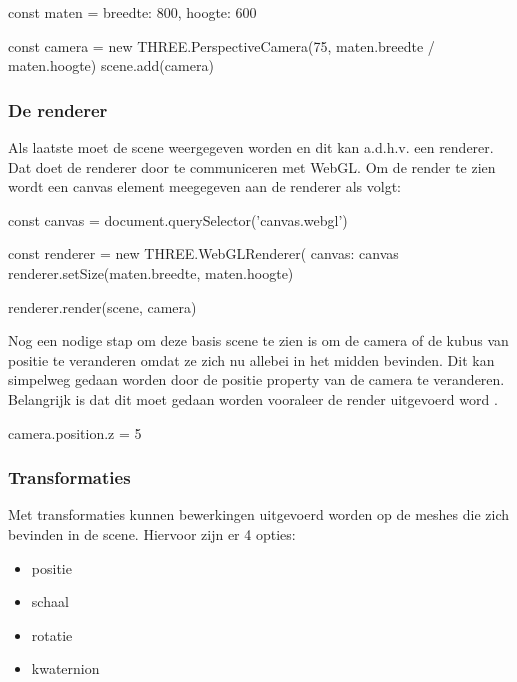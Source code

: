 \begin{LVerbatim}
const maten = {
	breedte: 800,
	hoogte: 600
}

const camera = new THREE.PerspectiveCamera(75, maten.breedte / maten.hoogte)
scene.add(camera)
\end{LVerbatim}

\subsubsection{De renderer}

Als laatste moet de scene weergegeven worden en dit kan a.d.h.v. een renderer. Dat doet de renderer door te communiceren met WebGL. Om de render te zien wordt een canvas element meegegeven aan de renderer als volgt: 

\begin{LVerbatim}
const canvas = document.querySelector('canvas.webgl')

const renderer = new THREE.WebGLRenderer({
	canvas: canvas
}
renderer.setSize(maten.breedte, maten.hoogte)

renderer.render(scene, camera)
\end{LVerbatim}

Nog een nodige stap om deze basis scene te zien is om de camera of de kubus van positie te veranderen omdat ze zich nu allebei in het midden bevinden. Dit kan simpelweg gedaan worden door de positie property van de camera te veranderen. Belangrijk is dat dit moet gedaan worden vooraleer de render uitgevoerd word \autocite{Simon2023}.

\begin{LVerbatim}

camera.position.z = 5

\end{LVerbatim}

\subsubsection{Transformaties}

Met transformaties kunnen bewerkingen uitgevoerd worden op de meshes die zich bevinden in de scene. Hiervoor zijn er 4 opties: 

\begin{itemize}
	\item positie
	\item schaal
	\item rotatie
	\item kwaternion
\end{itemize}

